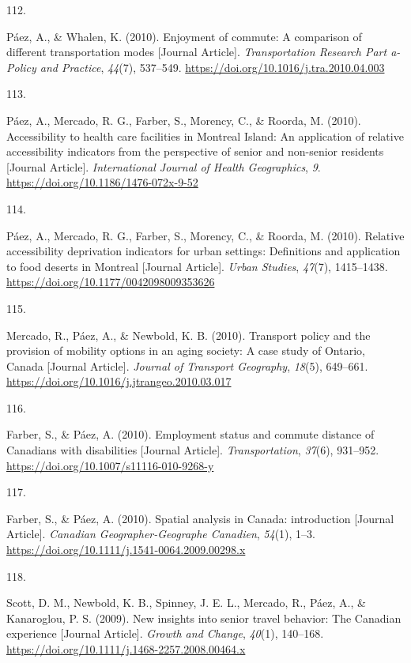 \documentclass[11pt,a4paper,]{awesome-cv}
\newlength{\cslhangindent}
\newlength{\csllabelwidth}
\newenvironment{CSLReferences}[2] %
 {\begin{list}{}{%
  \setlength{\itemindent}{0pt}
  \setlength{\leftmargin}{0pt}
  \setlength{\parsep}{0pt}
  \ifodd #1
   \setlength{\leftmargin}{\cslhangindent}
   \setlength{\itemindent}{-1\cslhangindent}
  \fi
  \setlength{\itemsep}{#2\baselineskip}}}
 {\end{list}}
\newcommand{\CSLLeftMargin}[1]{\parbox[t]{\csllabelwidth}{\strut#1\strut}}
\newcommand{\CSLRightInline}[1]{\parbox[t]{\linewidth - \csllabelwidth}{\strut#1\strut}}
\begin{document}
\begin{CSLReferences}{0}{0}
\CSLLeftMargin{112. }%
\CSLRightInline{Páez, A., \& Whalen, K. (2010). Enjoyment of commute: A
comparison of different transportation modes {[}Journal Article{]}.
\emph{Transportation Research Part a-Policy and Practice}, \emph{44}(7),
537--549. \url{https://doi.org/10.1016/j.tra.2010.04.003}}

\CSLLeftMargin{113. }%
\CSLRightInline{Páez, A., Mercado, R. G., Farber, S., Morency, C., \&
Roorda, M. (2010). Accessibility to health care facilities in Montreal
Island: An application of relative accessibility indicators from the
perspective of senior and non-senior residents {[}Journal Article{]}.
\emph{International Journal of Health Geographics}, \emph{9}.
\url{https://doi.org/10.1186/1476-072x-9-52}}

\CSLLeftMargin{114. }%
\CSLRightInline{Páez, A., Mercado, R. G., Farber, S., Morency, C., \&
Roorda, M. (2010). Relative accessibility deprivation indicators for
urban settings: Definitions and application to food deserts in Montreal
{[}Journal Article{]}. \emph{Urban Studies}, \emph{47}(7), 1415--1438.
\url{https://doi.org/10.1177/0042098009353626}}

\CSLLeftMargin{115. }%
\CSLRightInline{Mercado, R., Páez, A., \& Newbold, K. B. (2010).
Transport policy and the provision of mobility options in an aging
society: A case study of Ontario, Canada {[}Journal Article{]}.
\emph{Journal of Transport Geography}, \emph{18}(5), 649--661.
\url{https://doi.org/10.1016/j.jtrangeo.2010.03.017}}

\CSLLeftMargin{116. }%
\CSLRightInline{Farber, S., \& Páez, A. (2010). Employment status and
commute distance of Canadians with disabilities {[}Journal Article{]}.
\emph{Transportation}, \emph{37}(6), 931--952.
\url{https://doi.org/10.1007/s11116-010-9268-y}}

\CSLLeftMargin{117. }%
\CSLRightInline{Farber, S., \& Páez, A. (2010). Spatial analysis in
Canada: introduction {[}Journal Article{]}. \emph{Canadian
Geographer-Geographe Canadien}, \emph{54}(1), 1--3.
\url{https://doi.org/10.1111/j.1541-0064.2009.00298.x}}

\CSLLeftMargin{118. }%
\CSLRightInline{Scott, D. M., Newbold, K. B., Spinney, J. E. L.,
Mercado, R., Páez, A., \& Kanaroglou, P. S. (2009). New insights into
senior travel behavior: The Canadian experience {[}Journal Article{]}.
\emph{Growth and Change}, \emph{40}(1), 140--168.
\url{https://doi.org/10.1111/j.1468-2257.2008.00464.x}}


\end{CSLReferences}
\end{document}

